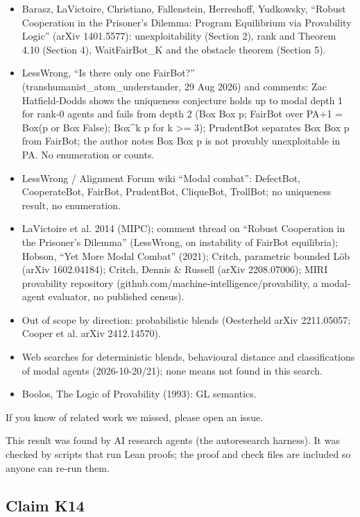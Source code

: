 \documentclass{article}
\begin{document}
\begin{itemize}
\item Barasz, LaVictoire, Christiano, Fallenstein, Herreshoff, Yudkowsky, ``Robust Cooperation in the Prisoner's Dilemma: Program Equilibrium via Provability Logic'' (arXiv 1401.5577): unexploitability (Section 2), rank and Theorem 4.10 (Section 4), WaitFairBot\_K and the obstacle theorem (Section 5).
\item LessWrong, ``Is there only one FairBot?'' (transhumanist\_atom\_understander, 29 Aug 2026) and comments: Zac Hatfield-Dodds shows the uniqueness conjecture holds up to modal depth 1 for rank-0 agents and fails from depth 2 (Box Box p; FairBot over PA+1 = Box(p or Box False); Box\textasciicircum{}k p for k \textgreater{}= 3); PrudentBot separates Box Box p from FairBot; the author notes Box Box p is not provably unexploitable in PA. No enumeration or counts.
\item LessWrong / Alignment Forum wiki ``Modal combat'': DefectBot, CooperateBot, FairBot, PrudentBot, CliqueBot, TrollBot; no uniqueness result, no enumeration.
\item LaVictoire et al. 2014 (MIPC); comment thread on ``Robust Cooperation in the Prisoner's Dilemma'' (LessWrong, on instability of FairBot equilibria); Hobson, ``Yet More Modal Combat'' (2021); Critch, parametric bounded Löb (arXiv 1602.04184); Critch, Dennis \& Russell (arXiv 2208.07006); MIRI provability repository (github.com/machine-intelligence/provability, a modal-agent evaluator, no published census).
\item Out of scope by direction: probabilistic blends (Oesterheld arXiv 2211.05057; Cooper et al. arXiv 2412.14570).
\item Web searches for deterministic blends, behavioural distance and classifications of modal agents (2026-10-20/21); none means not found in this search.
\item Boolos, The Logic of Provability (1993): GL semantics.
\end{itemize}

If you know of related work we missed, please open an issue.

This result was found by AI research agents (the autoresearch harness). It was checked by scripts that run Lean proofs; the proof and check files are included so anyone can re-run them.

\subsection*{Claim K14}
\end{document}

